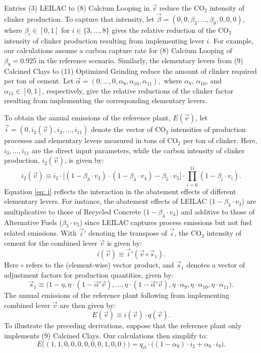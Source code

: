 \documentclass[12pt, a4paper]{article} %
\begin{document}
Entries (3) LEILAC to (8) Calcium Looping in  $\vec{v} $ reduce the CO$_2$ intensity of clinker production. To capture that intensity, let $\vec{\beta} = (0, 0, \beta_3, \ldots , \beta_8, 0, 0, 0),$ where $\beta_i \in [0,1]$ for $i \in \{3,\ldots,8\}$ gives the relative reduction of the CO$_2$ intensity of clinker production resulting from implementing lever $i$. For example, our calculations assume a carbon capture rate for (8) Calcium Looping of $\beta_8 = 0.925$ in the reference scenario. Similarly, the elementary levers from (9) Calcined Clays to (11) Optimized Grinding reduce the amount of clinker required per ton of cement. Let $\vec{\alpha} = (0, \ldots, 0, \alpha_9, \alpha_{10}, \alpha_{11}),$ where $\alpha_9$, $\alpha_{10}$, and $\alpha_{11} \in [0,1]$, respectively, give the relative reductions of the clinker factor resulting from implementing the corresponding elementary levers.

To obtain the annual emissions of the reference plant, $E(\vec{v})$, let $\vec{i} = (0, i_2(\vec{v}), i_3, \ldots, i_{11})$ denote the vector of CO$_2$ intensities of production processes and elementary levers measured in tons of CO$_2$ per ton of clinker. Here, $i_3, \ldots, i_{11}$ are the direct input parameters, while the carbon intensity of clinker production, $i_2(\vec{v})$, is given by:
\begin{equation}
\label{eq: i}
i_2(\vec{v}) \equiv i_2 \cdot \bigl[(1 - \beta_3 \cdot v_3) \cdot (1 - \beta_4 \cdot v_4) - \beta_5 \cdot v_5 \bigr] \cdot \prod\limits_{i=6}^{11} (1 - \beta_i \cdot v_i).
\end{equation}
Equation \eqref{eq: i} reflects the interaction in the abatement effects of different elementary levers. For instance, the abatement effects of LEILAC ($1 - \beta_3 \cdot v_3$) are multiplicative to those of Recycled Concrete ($1 - \beta_4 \cdot v_4$) and additive to those of Alternative Fuels ($\beta_5 \cdot v_5$) since LEILAC captures process emissions but not fuel related emissions. With $\vec{i}'$ denoting the transpose of $\vec{i}$, the CO$_2$ intensity of cement for the combined lever $\vec{v}$ is given by:
\begin{equation}
i(\vec{v}) \equiv \vec{i}' (\vec{v} \circ \vec{s}_1).
\end{equation}
Here $\circ$ refers to the (element-wise) vector product, and $\vec{s}_1$ denotes a vector of adjustment factors for production quantities, given by:
$$\vec{s}_1 \equiv \bigl(1-\eta, \eta \cdot (1-\vec{\alpha}'\vec{v}), \ldots, \eta \cdot (1-\vec{\alpha}'\vec{v}), \eta \cdot \alpha_9, \eta \cdot \alpha_{10}, \eta \cdot \alpha_{11}\bigr).$$
The annual emissions of the reference plant following from implementing combined lever $\vec{v}$ are then given by:
\begin{equation}
E(\vec{v}) \equiv i(\vec{v}) \cdot q(\vec{v}).
\end{equation}
To illustrate the preceding derivations, suppose that the reference plant only implements (9) Calcined Clays. Our calculations then simplify to:
$$E\bigl((1, 1, 0, 0, 0, 0, 0, 0, 1, 0, 0)\big) = q_{cl} \cdot \bigl((1 - \alpha_{9}) \cdot i_2 + \alpha_9 \cdot i_9 \bigr).$$
\end{document}
